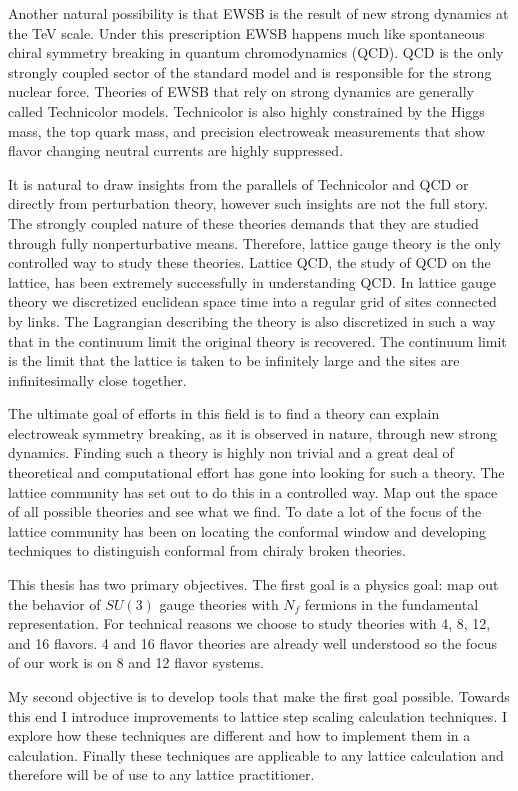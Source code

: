 Another natural possibility is that EWSB is the result of new strong dynamics at the TeV scale.
Under this prescription EWSB happens much like spontaneous chiral symmetry breaking in quantum chromodynamics (QCD).
QCD is the only strongly coupled sector of the standard model and is responsible for the strong nuclear force.
Theories of EWSB that rely on strong dynamics are generally called Technicolor models.
Technicolor is also highly constrained by the Higgs mass, the top quark mass, and precision electroweak measurements that show flavor changing neutral currents are highly suppressed.

It is natural to draw insights from the parallels of Technicolor and QCD or directly from perturbation theory, however such insights are not the full story.
The strongly coupled nature of these theories demands that they are studied through fully nonperturbative means.
Therefore, lattice gauge theory is the only controlled way to study these theories.
Lattice QCD, the study of QCD on the lattice, has been extremely successfully in understanding QCD.
In lattice gauge theory we discretized euclidean space time into a regular grid of sites connected by links.
The Lagrangian describing the theory is also discretized in such a way that in the continuum limit the original theory is recovered.
The continuum limit is the limit that the lattice is taken to be infinitely large and the sites are infinitesimally close together.

The ultimate goal of efforts in this field is to find a theory can explain electroweak symmetry breaking, as it is observed in nature, through new strong dynamics.
Finding such a theory is highly non trivial and a great deal of theoretical and computational effort has gone into looking for such a theory.
The lattice community has set out to do this in a controlled way.
Map out the space of all possible theories and see what we find.
To date a lot of the focus of the lattice community has been on locating the conformal window and developing techniques to distinguish conformal from chiraly broken theories.

This thesis has two primary objectives.
The first goal is a physics goal:  map out the behavior of $SU(3)$ gauge theories with $N_f$ fermions in the fundamental representation.
For technical reasons we choose to study theories with 4, 8, 12, and 16 flavors.
4 and 16 flavor theories are already well understood so the focus of our work is on 8 and 12 flavor systems.

My second objective is to develop tools that make the first goal possible.
Towards this end I introduce improvements to lattice step scaling calculation techniques.
I explore how these techniques are different and how to implement them in a calculation.
Finally these techniques are applicable to any lattice calculation and therefore will be of use to any lattice practitioner.

